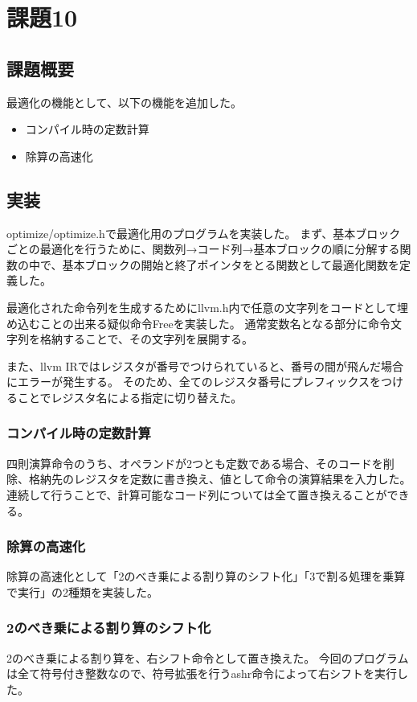 \section{課題10}
\subsection{課題概要}
最適化の機能として、以下の機能を追加した。
\begin{itemize}
  \item コンパイル時の定数計算
  \item 除算の高速化
\end{itemize}

\subsection{実装}
optimize/optimize.hで最適化用のプログラムを実装した。
まず、基本ブロックごとの最適化を行うために、関数列→コード列→基本ブロックの順に分解する関数の中で、基本ブロックの開始と終了ポインタをとる関数として最適化関数を定義した。

最適化された命令列を生成するためにllvm.h内で任意の文字列をコードとして埋め込むことの出来る疑似命令Freeを実装した。
通常変数名となる部分に命令文字列を格納することで、その文字列を展開する。

また、llvm IRではレジスタが番号でつけられていると、番号の間が飛んだ場合にエラーが発生する。
そのため、全てのレジスタ番号にプレフィックスをつけることでレジスタ名による指定に切り替えた。

\subsubsection{コンパイル時の定数計算}
四則演算命令のうち、オペランドが2つとも定数である場合、そのコードを削除、格納先のレジスタを定数に書き換え、値として命令の演算結果を入力した。
連続して行うことで、計算可能なコード列については全て置き換えることができる。

\subsubsection{除算の高速化}
除算の高速化として「2のべき乗による割り算のシフト化」「3で割る処理を乗算で実行」の2種類を実装した。

\subsubsection{2のべき乗による割り算のシフト化}
2のべき乗による割り算を、右シフト命令として置き換えた。
今回のプログラムは全て符号付き整数なので、符号拡張を行うashr命令によって右シフトを実行した。

